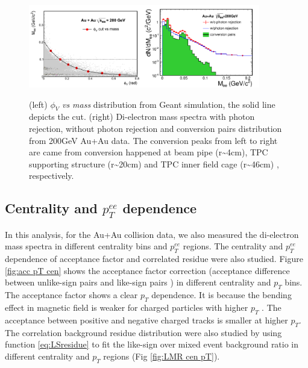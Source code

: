 \begin{figure}
\begin{centering}
\includegraphics[width=0.45\textwidth]{fig/3.Analysis/Additional/pic_phiV}\includegraphics[width=0.45\textwidth]{fig/3.Analysis/Additional/conversion}
\par\end{centering}

\protect\caption{(left) $\phi_{V}$ \emph{vs mass} distribution from Geant simulation,
the solid line depicts the cut. (right) Di-electron mass spectra with
photon rejection, without photon rejection and conversion pairs distribution
from 200GeV Au+Au data. The conversion peaks from left to right are
came from conversion happened at beam pipe (r\textasciitilde{}4cm),
TPC supporting structure (r\textasciitilde{}20cm) and TPC inner field
cage (r\textasciitilde{}46cm) ,  respectively.}


\label{fig:phiV}
\end{figure}



\subsection{Centrality and $p_{T}^{ee}$ dependence}

In this analysis, for the Au+Au collision data, we also measured the
di-electron mass spectra in different centrality bins and $p_{T}^{ee}$
regions. The centrality and $p_{T}^{ee}$ dependence of acceptance
factor and correlated residue were also studied. Figure \ref{fig:acc pT cen}
shows the acceptance factor correction (acceptance difference between
unlike-sign pairs and like-sign pairs ) in different centrality and
$p_{T}$ bins. The acceptance factor shows a clear $p_{T}$ dependence.
It is because the bending effect in magnetic field is weaker for charged
particles with higher $p_{T}$ . The acceptance between positive and
negative charged tracks is smaller at higher $p_{T}$. The correlation
background residue distribution were also studied by using function
\ref{eq:LSresidue} to fit the like-sign over mixed event background
ratio in different centrality and $p_{T}$ regions (Fig \ref{fig:LMR cen pT}).

